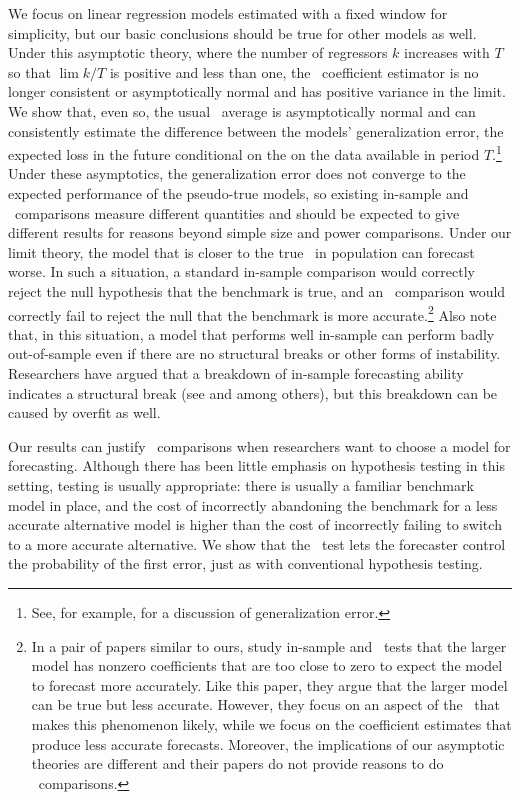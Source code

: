 \documentclass[11pt]{article}
\begin{document}
We focus on linear regression models estimated with a fixed window
for simplicity, but our basic
conclusions should be true for other models as well.  Under this
asymptotic theory, where the number of regressors $k$ increases with $T$
so that $\lim k/T$ is positive and less than one,
the \ols\ coefficient estimator is no longer
consistent or asymptotically normal \citep{Hub:73} and has positive
variance in the limit.  We show that, even so, the usual \oos\ average
is asymptotically normal and can consistently estimate the difference
between the models' generalization error, the expected loss in the
future conditional on the on the data available in period
$T$.\footnote{See, for example, \citet{HTF:08} for a discussion of
  generalization error.}  Under these asymptotics, the generalization
error does not converge to the expected performance of the pseudo-true
models, so existing in-sample and \oos\ comparisons measure different
quantities and should be expected to give different results for
reasons beyond simple size and power comparisons.  Under our limit theory,
the model that is closer to the true \dgp\ in population can forecast
worse.  In such a situation, a standard in-sample comparison would
correctly reject the null hypothesis that the benchmark is true, and
an \oos\ comparison would correctly fail to reject the null that the
benchmark is more accurate.\footnote{In a pair of papers similar to
  ours, \citet{ClM:12,ClM:12b} study in-sample and \oos\ tests that
  the larger model has nonzero coefficients that are too close to zero
  to expect the model to forecast more accurately.  Like this paper,
  they argue that the larger model can be true but less accurate.
  However, they focus on an aspect of the \dgp\ that makes this
  phenomenon likely, while we focus on the coefficient estimates that
  produce less accurate forecasts.  Moreover, the implications of our
  asymptotic theories are different and their papers do not provide
  reasons to do \oos\ comparisons.}
Also note that, in this situation, a model that performs well
in-sample can perform badly out-of-sample even if there are no
structural breaks or other forms of instability.  Researchers
have argued that a breakdown of in-sample forecasting ability
indicates a structural break (see \citealp{BoH:99} and
\citealp{StW:03} among others), but this breakdown can be caused by overfit as
well.

Our results can justify \oos\ comparisons when researchers want to
choose a model for forecasting.  Although there has been little
emphasis on hypothesis testing in this setting, testing is usually
appropriate: there is usually a familiar benchmark model in place, and
the cost of incorrectly abandoning the benchmark for a less accurate
alternative model is higher than the cost of incorrectly failing to
switch to a more accurate alternative.  We show that the \dmw\ test
lets the forecaster control the probability of the first error, just
as with conventional hypothesis testing.
\end{document}
